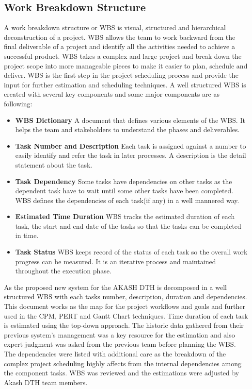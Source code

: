 \begin{spacing}{1}
 \subsection{Work Breakdown Structure}
 A work breakdown structure or WBS is visual, structured and hierarchical deconstruction of a project. WBS allows the team to work backward from the final deliverable of a project and identify all the activities needed to achieve a successful product. WBS takes a complex and large project and break down the project scope into more manageable pieces to make it easier to plan, schedule and deliver. WBS is the first step in the project scheduling process and provide the input for further estimation and scheduling techniques. A well structured WBS is created with several key components and some major components are as following:
 \begin{itemize}
 	\item \textbf{WBS Dictionary} \newline
 	A document that defines various elements of the WBS. It helps the team and stakeholders to understand the phases and deliverables.
 	\item \textbf{Task Number and Description} \newline Each task is assigned against a number to easily identify and refer the task in later processes. A description is the detail statement about the task.
 	\item \textbf{Task Dependency} \newline Some tasks have dependencies on other tasks as the dependent task have to wait until some other tasks have been completed. WBS defines the dependencies of each task(if any) in a well mannered way.
 	\item \textbf{Estimated Time Duration} \newline WBS tracks the estimated duration of each task, the start and end date of the tasks so that the tasks can be completed in time.
 	\item \textbf{Task Status} \newline WBS keeps record of the status of each task so the overall work progress can be measured. It is an iterative process and maintained throughout the execution phase.
 \end{itemize} 

As the proposed new system for the AKASH DTH is decomposed in a well structured WBS with each tasks number, description, duration and dependencies. This document works as the map for the project workflows and goals and further used in the CPM, PERT and Gantt Chart techniques. \newline
Time duration of each task is estimated using the top-down approach. The historic data gathered from their previous system's management was a key resource for the estimation and also expert judgment was asked from the previous team before planning the WBS. The dependencies were listed with additional care as the breakdown of the complex project scheduling highly affects from the internal dependencies among the component tasks. WBS was reviewed and the estimations were adjusted by Akash DTH team members.


\end{spacing}
